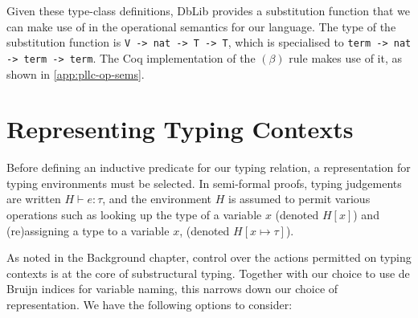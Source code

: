 \documentclass[]{unswthesis}
\let\c\texttt
\begin{document}
Given these type-class definitions, DbLib provides a substitution function that we can make use of in the operational semantics for our language. The type of the substitution function is \c{V -> nat -> T -> T}, which is specialised to \c{term -> nat -> term -> term}. The Coq implementation of the $(\beta)$ rule makes use of it, as shown in \cref{app:pllc-op-sems}.

\section{Representing Typing Contexts}
\label{sec:repr-ty-contexts}

Before defining an inductive predicate for our typing relation, a representation for typing environments must be selected. In semi-formal proofs, typing judgements are written $H \vdash e : \tau$, and the environment $H$ is assumed to permit various operations such as looking up the type of a variable $x$ (denoted $H[x]$) and (re)assigning a type to a variable $x$, (denoted $H[x \mapsto \tau]$).

As noted in the Background chapter, control over the actions permitted on typing contexts is at the core of substructural typing. Together with our choice to use de Bruijn indices for variable naming, this narrows down our choice of representation. We have the following options to consider:
\end{document}
